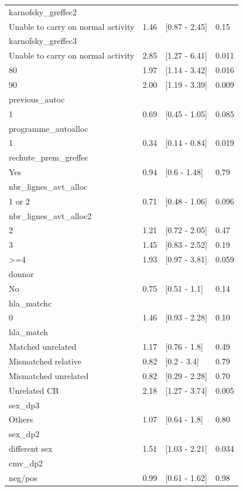 \documentclass[a4paper,11pt] {article}
\begin{document}
\begin{longtable}{lrll}
  karnofsky_greffec2 &  &  &  \\ 
  Unable to carry on normal activity & 1.46 & [0.87 - 2.45] & 0.15 \\ 
  karnofsky_greffec3 &  &  &  \\ 
  Unable to carry on normal activity & 2.85 & [1.27 - 6.41] & 0.011 \\ 
  80 & 1.97 & [1.14 - 3.42] & 0.016 \\ 
  90 & 2.00 & [1.19 - 3.39] & 0.009 \\ 
  previous_autoc &  &  &  \\ 
  1 & 0.69 & [0.45 - 1.05] & 0.085 \\ 
  programme_autoalloc &  &  &  \\ 
  1 & 0.34 & [0.14 - 0.84] & 0.019 \\ 
  rechute_prem_greffec &  &  &  \\ 
  Yes & 0.94 & [0.6 - 1.48] & 0.79 \\ 
  nbr_lignes_avt_alloc &  &  &  \\ 
  1 or 2 & 0.71 & [0.48 - 1.06] & 0.096 \\ 
  nbr_lignes_avt_alloc2 &  &  &  \\ 
  2 & 1.21 & [0.72 - 2.05] & 0.47 \\ 
  3 & 1.45 & [0.83 - 2.52] & 0.19 \\ 
  >=4 & 1.93 & [0.97 - 3.81] & 0.059 \\ 
  donnor &  &  &  \\ 
  No & 0.75 & [0.51 - 1.1] & 0.14 \\ 
  hla_matchc &  &  &  \\ 
  0 & 1.46 & [0.93 - 2.28] & 0.10 \\ 
  hla_match &  &  &  \\ 
  Matched unrelated & 1.17 & [0.76 - 1.8] & 0.49 \\ 
  Mismatched relative & 0.82 & [0.2 - 3.4] & 0.79 \\ 
  Mismatched unrelated & 0.82 & [0.29 - 2.28] & 0.70 \\ 
  Unrelated CB & 2.18 & [1.27 - 3.74] & 0.005 \\ 
  sex_dp3 &  &  &  \\ 
  Others & 1.07 & [0.64 - 1.8] & 0.80 \\ 
  sex_dp2 &  &  &  \\ 
  different sex & 1.51 & [1.03 - 2.21] & 0.034 \\ 
  cmv_dp2 &  &  &  \\ 
  neg/pos & 0.99 & [0.61 - 1.62] & 0.98 \\ 

\end{longtable}
\end{document}

